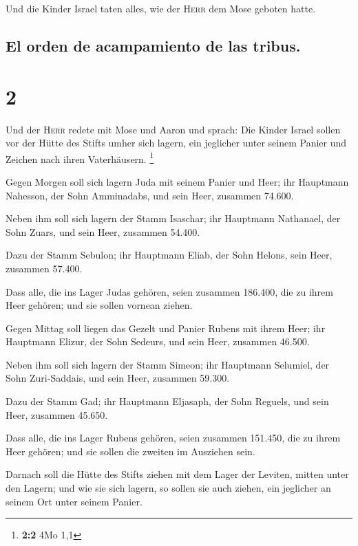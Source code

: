  Und die Kinder Israel taten alles, wie der \textsc{Herr}
dem Mose geboten hatte.

\hypertarget{el-orden-de-acampamiento-de-las-tribus.}{%
\subsection{El orden de acampamiento de las
tribus.}\label{el-orden-de-acampamiento-de-las-tribus.}}

\hypertarget{section-1}{%
\section{2}\label{section-1}}

 Und der \textsc{Herr} redete mit Mose und Aaron und
sprach:  Die Kinder Israel sollen vor der Hütte des Stifts
umher sich lagern, ein jeglicher unter seinem Panier und Zeichen nach
ihren Vaterhäusern. \footnote{\textbf{2:2} 4Mo 1,1}

 Gegen Morgen soll sich lagern Juda mit seinem Panier und
Heer; ihr Hauptmann Nahesson, der Sohn Amminadabs,  und
sein Heer, zusammen 74.600.

 Neben ihm soll sich lagern der Stamm Isaschar; ihr
Hauptmann Nathanael, der Sohn Zuars,  und sein Heer,
zusammen 54.400.

 Dazu der Stamm Sebulon; ihr Hauptmann Eliab, der Sohn
Helons,  sein Heer, zusammen 57.400.

 Dass alle, die ins Lager Judas gehören, seien zusammen
186.400, die zu ihrem Heer gehören; und sie sollen vornean ziehen.

 Gegen Mittag soll liegen das Gezelt und Panier Rubens
mit ihrem Heer; ihr Hauptmann Elizur, der Sohn Sedeurs, 
und sein Heer, zusammen 46.500.

 Neben ihm soll sich lagern der Stamm Simeon; ihr
Hauptmann Selumiel, der Sohn Zuri-Saddais,  und sein
Heer, zusammen 59.300.

 Dazu der Stamm Gad; ihr Hauptmann Eljasaph, der Sohn
Reguels,  und sein Heer, zusammen 45.650.

 Dass alle, die ins Lager Rubens gehören, seien zusammen
151.450, die zu ihrem Heer gehören; und sie sollen die zweiten im
Ausziehen sein.

 Darnach soll die Hütte des Stifts ziehen mit dem Lager
der Leviten, mitten unter den Lagern; und wie sie sich lagern, so sollen
sie auch ziehen, ein jeglicher an seinem Ort unter seinem Panier.

